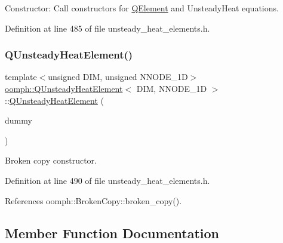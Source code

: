 Constructor\+: Call constructors for \hyperlink{classoomph_1_1QElement}{Q\+Element} and Unsteady\+Heat equations. 



Definition at line 485 of file unsteady\+\_\+heat\+\_\+elements.\+h.

\mbox{\label{classoomph_1_1QUnsteadyHeatElement_a608ef03a31a169422cc2b717b732434c}} 
\subsubsection{\texorpdfstring{Q\+Unsteady\+Heat\+Element()}{QUnsteadyHeatElement()}\hspace{0.1cm}{\footnotesize\ttfamily [2/2]}}
{\footnotesize\ttfamily template$<$unsigned D\+IM, unsigned N\+N\+O\+D\+E\+\_\+1D$>$ \\
\hyperlink{classoomph_1_1QUnsteadyHeatElement}{oomph\+::\+Q\+Unsteady\+Heat\+Element}$<$ D\+IM, N\+N\+O\+D\+E\+\_\+1D $>$\+::\hyperlink{classoomph_1_1QUnsteadyHeatElement}{Q\+Unsteady\+Heat\+Element} (\begin{DoxyParamCaption}\item[{const \hyperlink{classoomph_1_1QUnsteadyHeatElement}{Q\+Unsteady\+Heat\+Element}$<$ D\+IM, N\+N\+O\+D\+E\+\_\+1D $>$ \&}]{dummy }\end{DoxyParamCaption})\hspace{0.3cm}{\ttfamily [inline]}}



Broken copy constructor. 



Definition at line 490 of file unsteady\+\_\+heat\+\_\+elements.\+h.



References oomph\+::\+Broken\+Copy\+::broken\+\_\+copy().



\subsection{Member Function Documentation}
\mbox{\label{classoomph_1_1QUnsteadyHeatElement_ab9d47c020336e2c5accdca2014a5218e}} 
